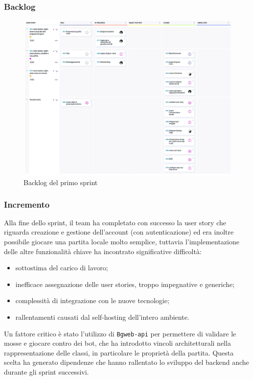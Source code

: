 \documentclass{article}
\begin{document}
\subsubsection{Backlog}
\begin{figure}[H]
    \centering
    \includegraphics[width=1\textwidth]{backlog1}
    \caption{Backlog del primo sprint}
    \label{fig:backlog-s1}
\end{figure}

\subsubsection{Incremento}
Alla fine dello sprint, il team ha completato con successo la user story che riguarda creazione e gestione dell'account 
(con autenticazione) ed era inoltre possibile giocare una partita locale molto semplice, tuttavia l'implementazione delle 
altre funzionalità chiave ha incontrato significative difficoltà:
\begin{itemize}
    \item sottostima del carico di lavoro;
    \item inefficace assegnazione delle user stories, troppo impegnative e generiche;
    \item complessità di integrazione con le nuove tecnologie;
    \item rallentamenti causati dal self-hosting dell'intero ambiente.
\end{itemize}

Un fattore critico è stato l'utilizzo di \texttt{Bgweb-api} per permettere di validare le mosse e giocare contro dei bot, 
che ha introdotto vincoli architetturali nella rappresentazione delle classi, in particolare le proprietà della partita. 
Questa scelta ha generato dipendenze che hanno rallentato lo sviluppo del backend anche durante gli sprint successivi.
\end{document}
